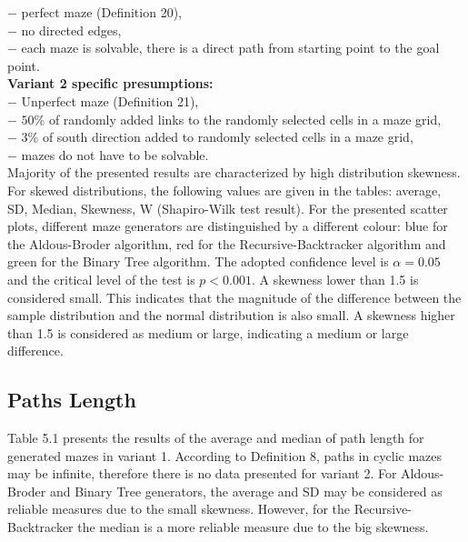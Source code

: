 $-$ perfect maze (Definition 20),\\
$-$ no directed edges,\\
$-$ each maze is solvable, there is a direct path from starting point to the goal point.\\
\textbf{Variant 2 specific presumptions: }\\
$-$ Unperfect maze (Definition 21),\\
$-$ $50\%$ of randomly added links to the randomly selected cells in a maze grid,\\
$-$ $3\%$ of south direction added to randomly selected cells in a maze grid,\\
$-$ mazes do not have to be solvable.\\
\newline
Majority of the presented results are characterized by high distribution skewness. For skewed distributions, the following values ​​are given in the tables:
average, SD, Median, Skewness, W (Shapiro-Wilk test result)\cite{34}. For the presented scatter plots, different maze generators are distinguished by a different colour:
blue for the Aldous-Broder algorithm, red for the Recursive-Backtracker algorithm and green for the Binary Tree algorithm. The adopted confidence level is $\alpha = 0.05$ and 
the critical level of the test is $p<0.001$. A skewness lower than 1.5 is considered small. This indicates that the magnitude of the difference between the
sample distribution and the normal distribution is also small. A skewness higher than 1.5 is considered as medium or large, indicating a medium or large difference.\\
\subsection{Paths Length}
Table 5.1 presents the results of the average and median of path length for generated mazes in variant 1.
According to Definition 8, paths in cyclic mazes may be infinite, therefore there is no data presented for variant 2. For Aldous-Broder and Binary Tree
generators, the average and SD may be considered as reliable measures due to the small skewness. However, for the Recursive-Backtracker the median is a more 
reliable measure due to the big skewness.
   

